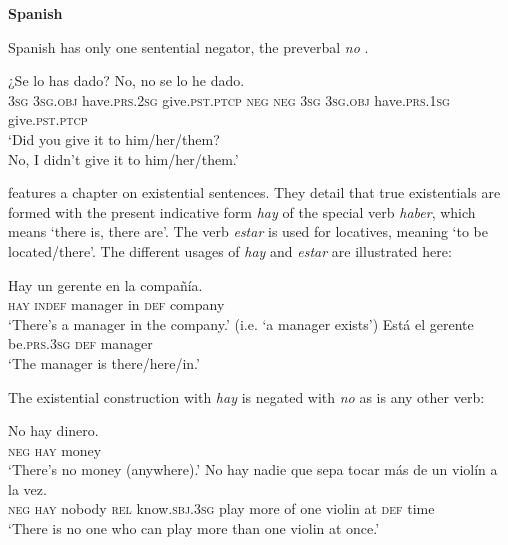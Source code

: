 ﻿\documentclass[output=paper]{langsci/langscibook}
\begin{document}
\begin{unindented}
\textbf{Spanish}

Spanish has only one sentential negator, the preverbal \textit{no}
\parencite[319ff]{ButtBenjamin1994}. 
%
\begin{exe}\ex \gll
¿Se lo has dado?\hspace{2.5in}
No, no se lo he dado.
\\
\textsc{3sg} \textsc{3sg.obj} have.\textsc{prs.2sg} give.\textsc{pst.ptcp}
\textsc{neg} \textsc{neg} \textsc{3sg} \textsc{3sg.obj} have.\textsc{prs.1sg} give.\textsc{pst.ptcp}
        \\
    \glt
‘Did you give it to him/her/them?\\
No, I didn’t give it to him/her/them.' \parencite[320]{ButtBenjamin1994}
    \end{exe}

\textcite[382ff]{ButtBenjamin1994} features a chapter on existential
sentences. They detail that true existentials are formed with the present
indicative form \textit{hay} of the special verb \textit{haber}, which
means `there is, there are'. The verb \textit{estar} is used for locatives,
meaning `to be located\slash there'. The different usages of \textit{hay} and \textit{estar} are illustrated here:
%
\begin{exe}\ex \gll Hay un gerente en la compañía. \\
\textsc{hay} \textsc{indef} manager in \textsc{def} company \\
    \glt `There's a manager in the company.' (i.e. `a manager exists')
\parencite[383]{ButtBenjamin1994}
\ex \gll Está el gerente \\
be.\textsc{prs.3sg} \textsc{def} manager \\
    \glt `The manager is there/here/in.' \parencite[383]{ButtBenjamin1994}
    \end{exe}

The existential construction with \textit{hay} is negated with \textit{no} as is any other verb:
%
\begin{exe}\ex \gll No hay dinero. \\
\textsc{neg} \textsc{hay} money \\
    \glt `There's no money (anywhere).' \parencite[383]{ButtBenjamin1994}
\ex \gll No hay nadie que  sepa tocar más  de un violín a  la vez. \\
\textsc{neg} \textsc{hay} nobody \textsc{rel} know.\textsc{sbj.3sg} play  more of  one violin at \textsc{def} time \\
    \glt `There is no one who can play more than one violin at once.'
\parencite[269]{ButtBenjamin1994}
    \end{exe}


\end{unindented}
\end{document}
